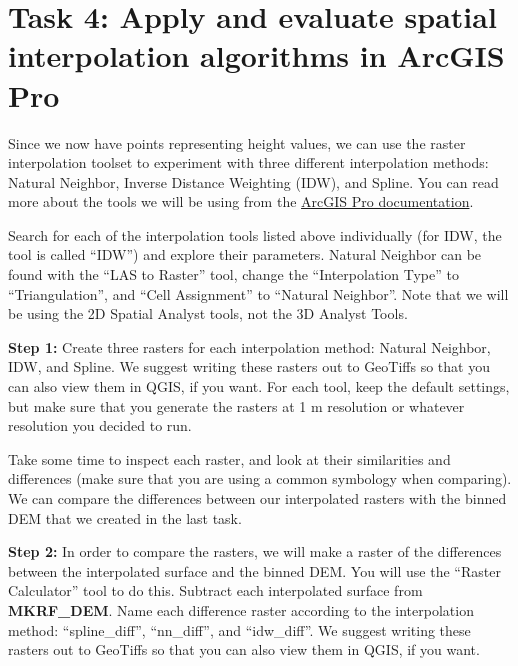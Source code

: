 \documentclass[
]{book}
\begin{document}
\hypertarget{task-4-apply-and-evaluate-spatial-interpolation-algorithms-in-arcgis-pro}{%
\section*{Task 4: Apply and evaluate spatial interpolation algorithms in ArcGIS Pro}\label{task-4-apply-and-evaluate-spatial-interpolation-algorithms-in-arcgis-pro}}

Since we now have points representing height values, we can use the raster interpolation toolset to experiment with three different interpolation methods: Natural Neighbor, Inverse Distance Weighting (IDW), and Spline. You can read more about the tools we will be using from the \href{https://pro.arcgis.com/en/pro-app/tool-reference/spatial-analyst/an-overview-of-the-interpolation-tools.htm}{ArcGIS Pro documentation}.

Search for each of the interpolation tools listed above individually (for IDW, the tool is called ``IDW'') and explore their parameters. Natural Neighbor can be found with the ``LAS to Raster'' tool, change the ``Interpolation Type'' to ``Triangulation'', and ``Cell Assignment'' to ``Natural Neighbor''. Note that we will be using the 2D Spatial Analyst tools, not the 3D Analyst Tools.

\textbf{Step 1:} Create three rasters for each interpolation method: Natural Neighbor, IDW, and Spline. We suggest writing these rasters out to GeoTiffs so that you can also view them in QGIS, if you want. For each tool, keep the default settings, but make sure that you generate the rasters at 1 m resolution or whatever resolution you decided to run.

Take some time to inspect each raster, and look at their similarities and differences (make sure that you are using a common symbology when comparing). We can compare the differences between our interpolated rasters with the binned DEM that we created in the last task.

\textbf{Step 2:} In order to compare the rasters, we will make a raster of the differences between the interpolated surface and the binned DEM. You will use the ``Raster Calculator'' tool to do this. Subtract each interpolated surface from \textbf{MKRF\_DEM}. Name each difference raster according to the interpolation method: ``spline\_diff'', ``nn\_diff'', and ``idw\_diff''. We suggest writing these rasters out to GeoTiffs so that you can also view them in QGIS, if you want.
\end{document}
